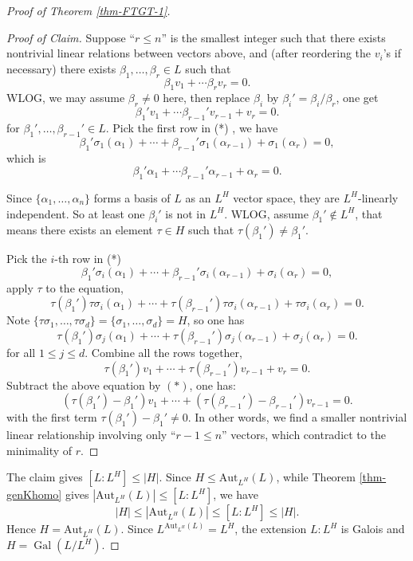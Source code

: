 \begin{proof}[Proof of Theorem \ref{thm-FTGT-1}]
\begin{proof}[Proof of Claim]
        Suppose ``$r\leq n$'' is the smallest integer such that there exists nontrivial linear relations between vectors above, and (after reordering the $v_i$'s if necessary) there exists $\beta_1, \dots, \beta_r \in L$ such that
        \[
        \beta_{1}v_{1}+\cdots \beta_{r}v_{r}=0. 
        \]
        WLOG, we may assume $\beta_{r}\neq 0$ here, then replace $\beta_{i}$ by $\beta_{i}'=\beta_{i}/ \beta_{r}$, one get 
        \[
        \beta_{1}'v_{1}+\cdots \beta_{r-1}'v_{r-1}+v_{r}=0. \tag*{(*)}
        \]
        for $\beta_1', \dots, \beta_{r-1}' \in L$. Pick the first row in (*) , we have 
        \[
        \beta_{1}'\sigma_{1}(\alpha_{1})+\cdots +\beta_{r-1}'\sigma_{1}(\alpha_{r-1})+\sigma_{1}(\alpha_{r})=0,
        \]
        which is 
        \[
        \beta_{1}'\alpha_{1}+\cdots \beta_{r-1}'\alpha_{r-1}+\alpha_{r}=0. 
        \]
        
        Since $\{\alpha_{1},\dots, \alpha_{n}\}$ forms a basis of $L$ as an $L^{H}$ vector space, they are $L^{H}$-linearly independent. So at least one $\beta_{i}'$ is not in $L^{H}$. WLOG, assume $\beta_{1}'\notin L^{H}$, that means there exists an element $\tau\in H$ such that $\tau(\beta_{1}') \neq \beta_{1}'$. 

        Pick the $i$-th row in (*)
        \[
        \beta_{1}'\sigma_{i}(\alpha_{1})+\cdots +\beta_{r-1}'\sigma_{i}(\alpha_{r-1})+\sigma_{i}(\alpha_{r})=0,
        \]
        apply $\tau$ to the equation, 
        \[
        \tau(\beta_{1}')\tau\sigma_{i}(\alpha_{1})+\cdots+\tau(\beta_{r-1}')\tau\sigma_{i}(\alpha_{r-1})+\tau\sigma_{i}(\alpha_{r})=0. 
        \]
        Note $\{\tau\sigma_{1}, \dots, \tau\sigma_{d}\} = \{\sigma_{1}, \dots, \sigma_{d}\} = H$, so one has
        \[
        \tau(\beta_{1}')\sigma_{j}(\alpha_{1})+\cdots+\tau(\beta_{r-1}')\sigma_{j}(\alpha_{r-1})+\sigma_{j}(\alpha_{r})=0.
        \]
        for all $1 \leq j \leq d$. Combine all the rows together, 
        \[
        \tau(\beta_{1}')v_{1}+\cdots+\tau(\beta_{r-1}')v_{r-1}+v_{r}=0.
        \]
    Subtract the above equation by $(*)$, one has:
        \[(\tau(\beta_{1}')-\beta_{1}')v_{1}+\cdots+(\tau(\beta_{r-1}')-\beta_{r-1}')v_{r-1}=0. \]
        with the first term $\tau(\beta_{1}')-\beta_{1}' \neq 0$. In other words, we find a smaller nontrivial linear relationship involving only ``$r-1\leq n$'' vectors, which contradict to the minimality of $r$. 
    \end{proof}

    The claim gives $[L:L^{H}]\leq |H|$. Since $H\leq \mathrm{Aut}_{L^H}(L)$, while Theorem \ref{thm-genKhomo} gives $|\mathrm{Aut}_{L^H}(L)|\leq [L:L^H]$, we have
    \[
    |H|\leq |\mathrm{Aut}_{L^H}(L)|\leq [L:L^H]\leq |H|.
    \]
    Hence $H=\mathrm{Aut}_{L^H}(L)$. Since $L^{\mathrm{Aut}_{L^H}(L)}=L^H$, the extension $L:L^H$ is Galois and $H=\operatorname{Gal}(L/L^H)$. 
\end{proof}


